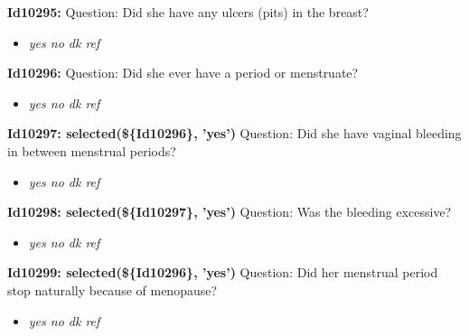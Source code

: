 \documentclass{article}%
\begin{document}
\textbf{Id10295: \newline%
}%
Question: Did she have any ulcers (pits) in the breast?\newline%
%
\begin{itemize}%
\item%
\textit{yes\newline%
 no\newline%
 dk\newline%
 ref\newline%
}%
\end{itemize}%
\textbf{Id10296: \newline%
}%
Question: Did she ever have a period or menstruate?\newline%
%
\begin{itemize}%
\item%
\textit{yes\newline%
 no\newline%
 dk\newline%
 ref\newline%
}%
\end{itemize}%
\textbf{Id10297: selected(\$\{Id10296\}, 'yes')\newline%
}%
Question: Did she have  vaginal bleeding in between menstrual periods?\newline%
%
\begin{itemize}%
\item%
\textit{yes\newline%
 no\newline%
 dk\newline%
 ref\newline%
}%
\end{itemize}%
\textbf{Id10298: selected(\$\{Id10297\}, 'yes')\newline%
}%
Question: Was the bleeding excessive?\newline%
%
\begin{itemize}%
\item%
\textit{yes\newline%
 no\newline%
 dk\newline%
 ref\newline%
}%
\end{itemize}%
\textbf{Id10299: selected(\$\{Id10296\}, 'yes')\newline%
}%
Question: Did her menstrual period stop naturally because of menopause?\newline%
%
\begin{itemize}%
\item%
\textit{yes\newline%
 no\newline%
 dk\newline%
 ref\newline%
}%
\end{itemize}%
\end{document}
